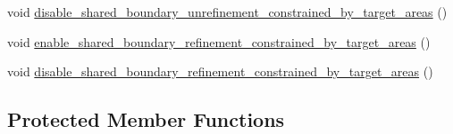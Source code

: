 \begin{DoxyCompactItemize}
$$void \hyperlink{classoomph_1_1RefineableTriangleMesh_a6f8615dc6e68b6a8fdf0e4f3b5bb1e12}{disable\+\_\+shared\+\_\+boundary\+\_\+unrefinement\+\_\+constrained\+\_\+by\+\_\+target\+\_\+areas} ()
\item 
void \hyperlink{classoomph_1_1RefineableTriangleMesh_adc4d8e616b73c6b3805501fe4761b24f}{enable\+\_\+shared\+\_\+boundary\+\_\+refinement\+\_\+constrained\+\_\+by\+\_\+target\+\_\+areas} ()
\item 
void \hyperlink{classoomph_1_1RefineableTriangleMesh_a7c0a6d1e167ae19275556d3bb1a6b232}{disable\+\_\+shared\+\_\+boundary\+\_\+refinement\+\_\+constrained\+\_\+by\+\_\+target\+\_\+areas} ()
\end{DoxyCompactItemize}
\subsection*{Protected Member Functions}
